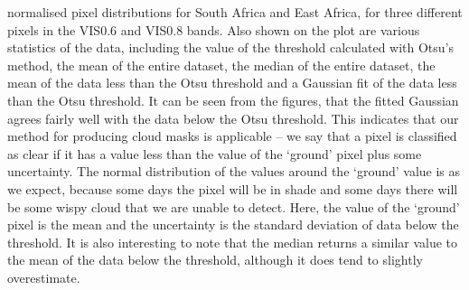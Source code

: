 normalised pixel distributions for South Africa and East Africa, for
three different pixels in the VIS0.6 and VIS0.8 bands. Also shown on
the plot are various statistics of the data, including the value of
the threshold calculated with Otsu's method, the mean of the entire
dataset, the median of the entire dataset, the mean of the data less
than the Otsu threshold and a Gaussian fit of the data less than the
Otsu threshold. It can be seen from the figures, that the fitted
Gaussian agrees fairly well with the data below the Otsu
threshold. This indicates that our method for producing cloud masks is
applicable -- we say that a pixel is classified as clear if it has a
value less than the value of the `ground' pixel plus some
uncertainty. The normal distribution of the values around the `ground'
value is as we expect, because some days the pixel will be in shade
and some days there will be some wispy cloud that we are unable to
detect. Here, the value of the `ground' pixel is the mean and the
uncertainty is the standard deviation of data below the threshold. It
is also interesting to note that the median returns a similar value to
the mean of the data below the threshold, although it does tend to
slightly overestimate.

